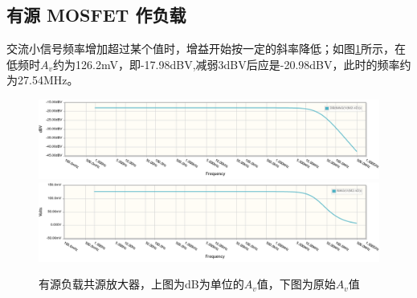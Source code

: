 \documentclass[a4paper]{article}
\begin{document}
\subsection{有源 MOSFET 作负载}
交流小信号频率增加超过某个值时，增益开始按一定的斜率降低；如图\ref{fig:4}所示，在低频时$A_v$约为126.2mV，即-17.98dBV,减弱3dBV后应是-20.98dBV，此时的频率约为27.54MHz。
\begin{figure}[htp]
\centering
\includegraphics[width=1.0\linewidth]{37.png}
\includegraphics[width=1.0\linewidth]{38.png}
\caption{有源负载共源放大器，上图为dB为单位的$A_v$值，下图为原始$A_v$值}
\label{fig:4}
\end{figure}
\end{document}
